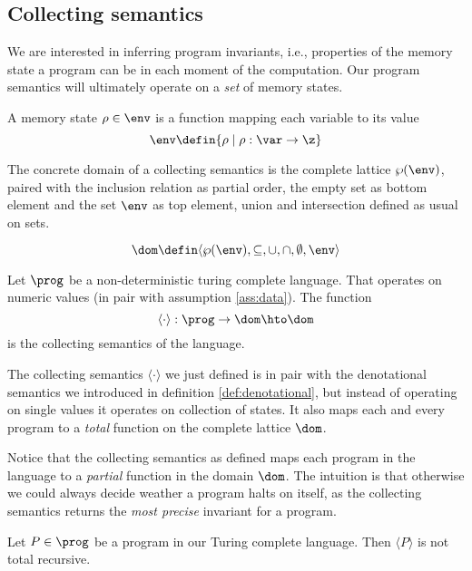\subsection{Collecting semantics}

We are interested in inferring program invariants, i.e., properties of
the memory state a program can be in each moment of the
computation. Our program semantics will ultimately operate on a
\emph{set} of memory states.

\begin{definition}\label{def:states}
  A memory state \(\rho \in \env\) is a function mapping each variable
  to its value \[\env \defin \{\rho \mid \rho : \var \to \z\}\]
\end{definition}

\begin{definition}\label{def:concrete}
  The concrete domain of a collecting semantics is the complete
  lattice \(\wp(\env)\), paired with the inclusion relation as partial
  order, the empty set as bottom element and the set \(\env\) as top
  element, union and intersection defined as usual on sets.

  \[\dom \defin \langle \wp(\env), \subseteq, \cup, \cap,
  \emptyset, \env \rangle\]
\end{definition}

\begin{definition}\label{def:collecting}
  Let \(\prog\) be a non-deterministic turing complete language. That
  operates on numeric values (in pair with assumption
  \ref{ass:data}). The function \[\langle \cdot \rangle : \prog \to
  \dom \hto \dom\] is the collecting semantics of the language.
\end{definition}

The collecting semantics \(\langle \cdot \rangle\) we just defined is
in pair with the denotational semantics we introduced in definition
\ref{def:denotational}, but instead of operating on single values it
operates on collection of states. It also maps each and every program
to a \emph{total} function on the complete lattice \(\dom\).

Notice that the collecting semantics as defined maps each program in
the language to a \emph{partial} function in the domain \(\dom\). The
intuition is that otherwise we could always decide weather a program
halts on itself, as the collecting semantics returns the \emph{most
precise} invariant for a program.

\begin{theorem}
  Let \(P\in\prog\) be a program in our Turing complete language. Then
  \(\langle P \rangle\) is not total recursive.
\end{theorem}

